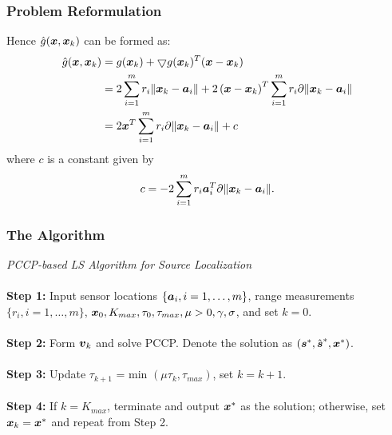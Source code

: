 \documentclass [t] {beamer} %
\begin{document}
\begin{frame} 
\frametitle{Problem Reformulation}
\phantom{m}
Hence  $ \hat{g}(\mbox{\boldmath$x$},\mbox{\boldmath$x$}_k) $ can be formed as: 
\begin{equation} 
\nonumber
\begin{aligned}
  \hat{g}(\mbox{\boldmath$x$},\mbox{\boldmath$x$}_k)   & =   g(\mbox{\boldmath$x$}_k) +  \bigtriangledown g(\mbox{\boldmath$x$}_k)^T(\mbox{\boldmath$x$} - \mbox{\boldmath$x$}_k) \\
  & =   2 \sum^m_{i=1} r_i \|\mbox{\boldmath$x$}_k - \mbox{\boldmath$a$}_i\|   +  2 \left( \mbox{\boldmath$x$} - \mbox{\boldmath$x$}_k \right)^{T} \sum^m_{i=1} r_i \partial \|\mbox{\boldmath$x$}_k - \mbox{\boldmath$a$}_i\| \\
& = 2\mbox{\boldmath$x$}^T \sum^m_{i=1} r_i \partial \|\mbox{\boldmath$x$}_k - \mbox{\boldmath$a$}_i \| + c
\end{aligned}
\end{equation} 
where $c$ is a constant given  by
\begin{equation} 
\nonumber
 c = - 2 \sum_{i = 1}^m r_i \mbox{\boldmath$a$}_i^T \partial \|\mbox{\boldmath$x$}_k - \mbox{\boldmath$a$}_i\|.
\end{equation} 
\end{frame}

\begin{frame}
\frametitle{The Algorithm}
{\large \textit{PCCP-based LS Algorithm for Source Localization}}
\\~\\
\textbf{Step 1:} Input sensor locations $\{\mbox{\boldmath$a$}_i, i = 1,\ldots,m\}$, range measurements $\{r_i, i = 1, \ldots, m\}$, $\mbox{\boldmath$x$}_0, K_{max}, \tau_0, \tau_{max}, \mu > 0, \gamma, \sigma$, and set $k = 0$. 
\\~\\
\textbf{Step 2:} Form  $\mbox{\boldmath$v$}_k$ and solve PCCP. Denote the solution as  $(\mbox{\boldmath$s$}^*, \hat{\mbox{\boldmath$s$}}^*, \mbox{\boldmath$x$}^*)$. 
\\~\\
\textbf{Step 3:} Update  $\tau_{k+1} $ = min $(\mu\tau_k, \tau_{max})$, set $k = k+1$. 
\\~\\
\textbf{Step 4:} If $k = K_{max}$, terminate and output $\mbox{\boldmath$x$}^*$ as the solution; otherwise, set $\mbox{\boldmath$x$}_k = \mbox{\boldmath$x$}^*$ and repeat from Step 2. 
\end{frame}



%
%
\end{document}
